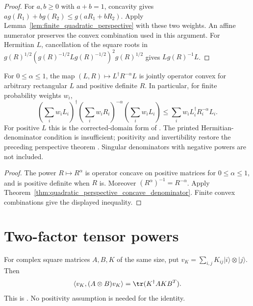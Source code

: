 \begin{proof}\leanok
    For $a,b\geq0$ with $a+b=1$, concavity gives
    $ag(R_1)+bg(R_2)\leq g(aR_1+bR_2)$. Apply
    Lemma~\ref{lem:finite_quadratic_perspective} with these two weights.
    An affine numerator preserves the convex combination used in this argument.
    For Hermitian $L$, cancellation of the square roots in
    $g(R)^{1/2}(g(R)^{-1/2}Lg(R)^{-1/2})^2g(R)^{1/2}$ gives
    $Lg(R)^{-1}L$.
\end{proof}

\begin{corollary}
    \label{cor:inverse_power_quadratic_perspective}
    \leanok
    For $0\leq\alpha\leq1$, the map
    $(L,R)\mapsto L^\dagger R^{-\alpha}L$ is jointly operator convex
    for arbitrary rectangular $L$ and positive definite $R$.
    In particular, for finite probability weights $w_i$,
    \[
        \left(\sum_iw_iL_i\right)^\dagger
        \left(\sum_iw_iR_i\right)^{-\alpha}
        \left(\sum_iw_iL_i\right)
        \leq\sum_iw_iL_i^\dagger R_i^{-\alpha}L_i.
    \]
    For positive $L$ this is the corrected-domain form of
    \cite[Corollary~5.4(1)]{Wolf2012Quantum}. The printed Hermitian-denominator
    condition is insufficient; positivity and invertibility restore the
    preceding perspective theorem
    \cite{gap:wolf_ch5_quadratic_perspective_domain}.
    Singular denominators with negative powers are not included.
\end{corollary}

\begin{proof}\leanok
    The power $R\mapsto R^\alpha$ is operator concave on positive matrices
    for $0\leq\alpha\leq1$, and is positive definite when $R$ is.
    Moreover $(R^\alpha)^{-1}=R^{-\alpha}$. Apply
    Theorem~\ref{thm:quadratic_perspective_concave_denominator}.
    Finite convex combinations give the displayed inequality.
\end{proof}

\section{Two-factor tensor powers}

\begin{lemma}
    \label{lem:vec_transpose_kronecker_quadratic}
    \leanok
    For complex square matrices $A,B,K$ of the same size, put
    $v_K=\sum_{i,j}K_{ij}\lvert i\rangle\otimes\lvert j\rangle$. Then
    \[
        \langle v_K,(A\otimes B)v_K\rangle
        =\tr(K^\dagger A K B^T).
    \]
    This is \cite[Equation~(5.48)]{Wolf2012Quantum}. No positivity assumption
    is needed for the identity.
\end{lemma}

